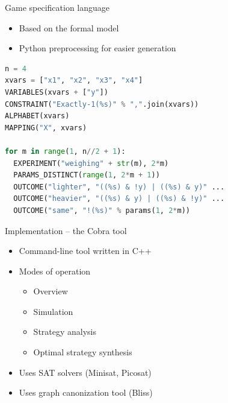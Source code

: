 \documentclass{beamer}
\begin{document}
\begin{frame}[fragile]{Game specification language}
\begin{itemize}
\item Based on the formal model
\item Python preprocessing for easier generation
\end{itemize}

\pause
\begin{lstlisting}[language=Python]
n = 4
xvars = ["x1", "x2", "x3", "x4"]
VARIABLES(xvars + ["y"])
CONSTRAINT("Exactly-1(%s)" % ",".join(xvars))
ALPHABET(xvars)
MAPPING("X", xvars)

for m in range(1, n//2 + 1):
  EXPERIMENT("weighing" + str(m), 2*m)
  PARAMS_DISTINCT(range(1, 2*m + 1))
  OUTCOME("lighter", "((%s) & !y) | ((%s) & y)" ...
  OUTCOME("heavier", "((%s) & y) | ((%s) & !y)" ...
  OUTCOME("same", "!(%s)" % params(1, 2*m))
\end{lstlisting}
\end{frame}

\begin{frame}{Implementation -- the Cobra tool}
\begin{itemize} \itemsep 10pt
\item Command-line tool written in C++
\item Modes of operation
  \begin{itemize}
  \item Overview
  \item Simulation
  \item Strategy analysis
  \item Optimal strategy synthesis
  \end{itemize}
\item Uses SAT solvers (Minisat, Picosat)
\item Uses graph canonization tool (Bliss)
\end{itemize}
\end{frame}
\end{document}
